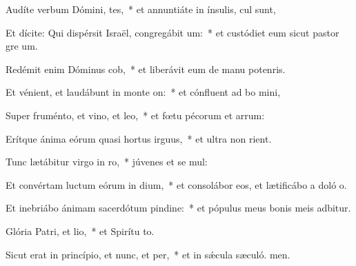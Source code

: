 \item Audíte verbum Dómini, tes,~* et annuntiáte in ínsulis,  cul sunt,
\item Et dícite: Qui dispérsit Israël, congregábit um:~* et custódiet eum sicut pastor gre um.
\item Redémit enim Dóminus cob,~* et liberávit eum de manu potenris.
\item Et vénient, et laudábunt in monte on:~* et cónfluent ad bo mini,
\item Super fruménto, et vino, et leo,~* et fœtu pécorum et arrum:
\item Erítque ánima eórum quasi hortus irguus,~* et ultra non rient.
\item Tunc lætábitur virgo in ro,~* júvenes et se mul:
\item Et convértam luctum eórum in dium,~* et consolábor eos, et lætificábo a doló o.
\item Et inebriábo ánimam sacerdótum pindine:~* et pópulus meus bonis meis adbitur.
\item Glória Patri, et lio,~* et Spirítu to.
\item Sicut erat in princípio, et nunc, et per,~* et in sǽcula sæculó. men.
